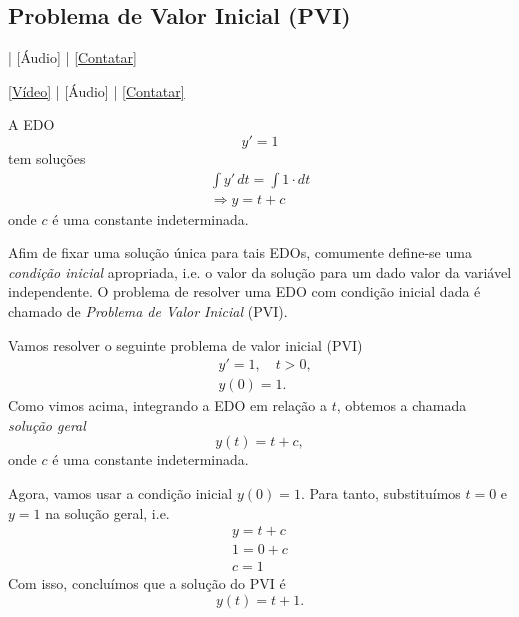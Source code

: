 \subsection{Problema de Valor Inicial (PVI)}

\begin{flushright}
  [Vídeo] | [Áudio] | \href{https://phkonzen.github.io/notas/contato.html}{[Contatar]}
\end{flushright}

\begin{flushright}
  \href{https://archive.org/details/edo-pvi}{[Vídeo]} | [Áudio] | \href{https://phkonzen.github.io/notas/contato.html}{[Contatar]}
\end{flushright}

\begin{ex}
  A EDO
  \begin{equation}
    y' = 1
  \end{equation}
  tem soluções
  \begin{gather}
    \int y'\,dt = \int 1\cdot dt\\
    \Rightarrow y = t + c
  \end{gather}
  onde $c$ é uma constante indeterminada.
\end{ex}

Afim de fixar uma solução única para tais EDOs, comumente define-se uma \emph{condição inicial} apropriada, i.e. o valor da solução para um dado valor da variável independente. O problema de resolver uma EDO com condição inicial dada é chamado de \emph{Problema de Valor Inicial} (PVI).

\begin{ex}
  Vamos resolver o seguinte problema de valor inicial (PVI)
  \begin{align}
    &y' = 1,\quad t>0,\\
    &y(0)=1.
  \end{align}
  Como vimos acima, integrando a EDO em relação a $t$, obtemos a chamada \emph{solução geral}
  \begin{equation}
    y(t) = t + c,
  \end{equation}
  onde $c$ é uma constante indeterminada.

  Agora, vamos usar a condição inicial $y(0)=1$. Para tanto, substituímos $t=0$ e $y=1$ na solução geral, i.e.
  \begin{gather}
    y = t + c\\
    1 = 0 + c\\
    c = 1
  \end{gather}
  Com isso, concluímos que a solução do PVI é
  \begin{equation}
    y(t) = t + 1.
  \end{equation}
\end{ex}



